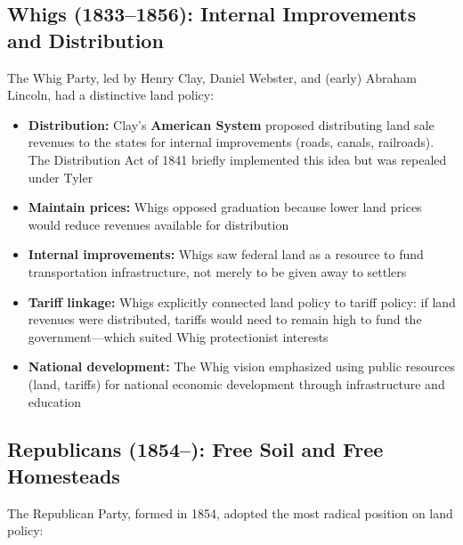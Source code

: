 \documentclass[12pt]{article}
\begin{document}
\subsection{Whigs (1833--1856): Internal Improvements and Distribution}

The Whig Party, led by Henry Clay, Daniel Webster, and (early) Abraham Lincoln, had a distinctive land policy:

\begin{itemize}
\item \textbf{Distribution:} Clay's \textbf{American System} proposed distributing land sale revenues to the states for internal improvements (roads, canals, railroads).  The Distribution Act of 1841 briefly implemented this idea but was repealed under Tyler
\item \textbf{Maintain prices:} Whigs opposed graduation because lower land prices would reduce revenues available for distribution
\item \textbf{Internal improvements:} Whigs saw federal land as a resource to fund transportation infrastructure, not merely to be given away to settlers
\item \textbf{Tariff linkage:} Whigs explicitly connected land policy to tariff policy: if land revenues were distributed, tariffs would need to remain high to fund the government---which suited Whig protectionist interests
\item \textbf{National development:} The Whig vision emphasized using public resources (land, tariffs) for national economic development through infrastructure and education
\end{itemize}

\subsection{Republicans (1854--): Free Soil and Free Homesteads}

The Republican Party, formed in 1854, adopted the most radical position on land policy:
\end{document}

